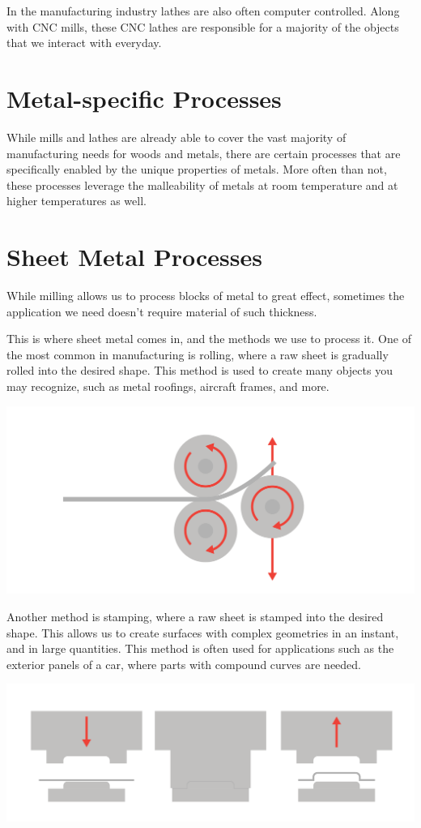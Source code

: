 In the manufacturing industry lathes are also often computer controlled. Along with CNC mills, these CNC lathes are responsible for a majority of the objects that we interact with everyday.

\section{Metal-specific Processes}

While mills and lathes are already able to cover the vast majority of manufacturing needs for woods and metals, there are certain processes that are specifically enabled by the unique properties of metals. More often than not, these processes leverage the malleability of metals at room temperature and at higher temperatures as well.

\section{Sheet Metal Processes}

While milling allows us to process blocks of metal to great effect, sometimes the application we need doesn’t require material of such thickness.

This is where sheet metal comes in, and the methods we use to process it. One of the most common in manufacturing is rolling, where a raw sheet is gradually rolled into the desired shape. This method is used to create many objects you may recognize, such as metal roofings, aircraft frames, and more.

\includegraphics[width=.75\textwidth]{rolling.png}


Another method is stamping, where a raw sheet is stamped into the desired shape. This allows us to create surfaces with complex geometries in an instant, and in large quantities. This method is often used for applications such as the exterior panels of a car, where parts with compound curves are needed.

\includegraphics[width=.75\textwidth]{stamping.png}



